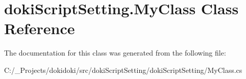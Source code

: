 \hypertarget{classdoki_script_setting_1_1_my_class}{}\section{doki\+Script\+Setting.\+My\+Class Class Reference}
\label{classdoki_script_setting_1_1_my_class}


The documentation for this class was generated from the following file\+:\begin{DoxyCompactItemize}
\item 
C\+:/\+\_\+\+Projects/dokidoki/src/doki\+Script\+Setting/doki\+Script\+Setting/My\+Class.\+cs\end{DoxyCompactItemize}
